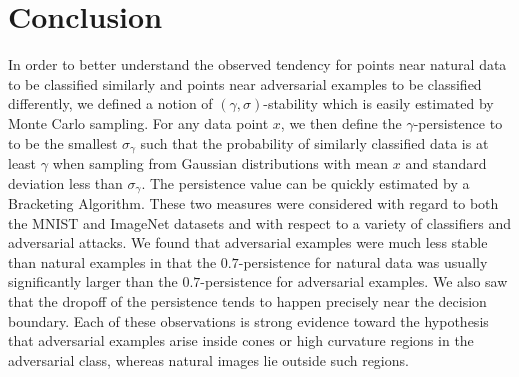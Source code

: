 

\section{Conclusion}





In order to better understand the observed tendency for points near natural data to be classified similarly and points near
adversarial examples to be classified differently, we defined a notion of $(\gamma,\sigma)$-stability which is easily estimated by Monte Carlo sampling. For any data point $x$, we then define the $\gamma$-persistence to to be the smallest $\sigma_\gamma$ such that the probability of similarly classified data is at least $\gamma$ when sampling from Gaussian distributions with mean $x$ and standard deviation less than $\sigma_\gamma$. The persistence value can be quickly estimated by a Bracketing Algorithm. These two measures were considered with regard to both the MNIST and ImageNet datasets and with respect to a variety of classifiers and adversarial attacks. We found that adversarial examples were much less stable than natural examples in that the $0.7$-persistence for natural data was usually significantly larger than the $0.7$-persistence for adversarial examples. We also saw that the dropoff of the persistence tends to happen precisely near the decision boundary. Each of these observations is strong evidence toward the hypothesis that adversarial examples arise inside cones or high curvature regions in the adversarial class, whereas natural images lie outside such regions.

